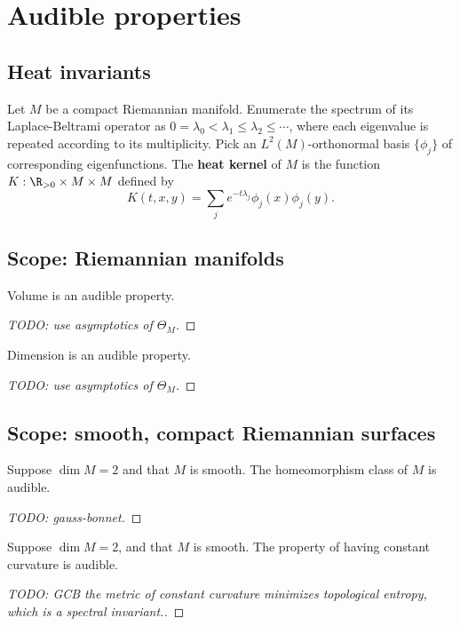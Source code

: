 \documentclass{amsart}
\begin{document}
	
	\section{Audible properties}
	\subsection{Heat invariants}
Let $M$ be a compact Riemannian manifold. Enumerate the spectrum of its Laplace-Beltrami operator as $0 = \lambda_0 < \lambda_1 \leq \lambda_2 \leq \cdots $, where each eigenvalue is repeated according to its multiplicity. Pick an $L^2(M)$-orthonormal basis $\{ \phi_j  \}$ of corresponding eigenfunctions.  The \textbf{heat kernel} of $M$ is the function $K : \R_{>0} \times M \times M$ defined by 
\begin{equation}
	K(t,x,y) = \sum_{j} e^{-t \lambda_j} \phi_j(x)\phi_j(y). 
\end{equation}	



	\subsection{Scope: Riemannian manifolds}
	\begin{thm}
		Volume is an audible property.
	\end{thm}
	\begin{proof}
		[TODO: use asymptotics of $\Theta_M$]
	\end{proof}
	\begin{thm}
		Dimension is an audible property.
	\end{thm}
	\begin{proof}
		[TODO: use asymptotics of $\Theta_M$]
	\end{proof}
	\subsection{Scope: smooth, compact Riemannian surfaces}
	\begin{thm}
		Suppose $\dim M = 2$ and that $M$ is smooth. The homeomorphism class of
		$M$ is audible.
	\end{thm}
	\begin{proof}
		[TODO: gauss-bonnet]
	\end{proof}
	\begin{thm}
		Suppose $\dim M = 2$, and that $M$ is smooth. The property of having constant
		curvature is audible.
	\end{thm}
	\begin{proof}
		[TODO: GCB the metric of constant curvature minimizes topological
		entropy, which is a spectral invariant.]
	\end{proof}
\end{document}
